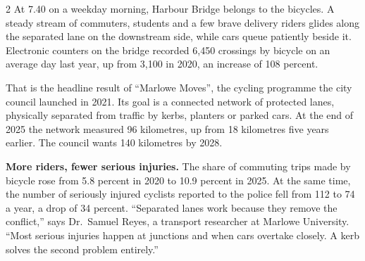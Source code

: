 \documentclass[10pt,a4paper]{article}
\begin{document}
\begin{multicols}{2}
\raggedcolumns
At 7.40 on a weekday morning, Harbour Bridge belongs to the bicycles. A steady stream of commuters,
students and a few brave delivery riders glides along the separated lane on the downstream side, while
cars queue patiently beside it. Electronic counters on the bridge recorded 6,450 crossings by bicycle on an average
day last year, up from 3,100 in 2020, an increase of 108 percent.

That is the headline result of ``Marlowe Moves'', the cycling programme the city council launched in 2021.
Its goal is a connected network of protected lanes, physically separated from traffic by kerbs, planters
or parked cars. At the end of 2025 the network measured 96 kilometres, up from 18 kilometres five years
earlier. The council wants 140 kilometres by 2028.

\begin{minipage}{\columnwidth}
\centering
{}
\end{minipage}
\medskip


\textbf{More riders, fewer serious injuries.} The share of commuting trips made by bicycle rose from
5.8 percent in 2020 to 10.9 percent in 2025. At the same time, the number of seriously injured cyclists
reported to the police fell from 112 to 74 a year, a drop of 34 percent. ``Separated lanes work because they
remove the conflict,'' says Dr.\ Samuel Reyes, a transport researcher at Marlowe University. ``Most serious
injuries happen at junctions and when cars overtake closely. A kerb solves the second problem entirely.''


\end{multicols}
\end{document}
